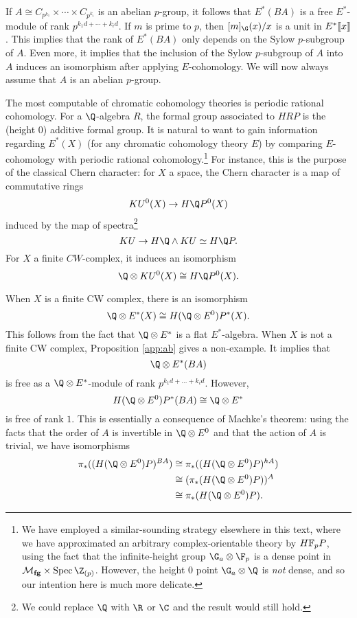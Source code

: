 If \(A \cong C_{p^{k_1}} \times \cdots \times C_{p^{k_i}}\) is an abelian \(p\)-group, it follows that \(E^*(BA)\) is a free \(E^*\)-module of rank \(p^{k_1d+\cdots + k_id}\). If \(m\) is prime to \(p\), then \([m]_{\G}(x)/x\) is a unit in \(E^*\llbracket{x}\rrbracket\). This implies that the rank of \(E^*(BA)\) only depends on the Sylow \(p\)-subgroup of \(A\). Even more, it implies that the inclusion of the Sylow \(p\)-subgroup of \(A\) into \(A\) induces an isomorphism after applying $E$-cohomology. We will now always assume that \(A\) is an abelian \(p\)-group.

The most computable of chromatic cohomology theories is periodic rational cohomology. For a \(\Q\)-algebra \(R\), the formal group associated to \(HRP\) is the (height \(0\)) additive formal group. It is natural to want to gain information regarding \(E^*(X)\) (for any chromatic cohomology theory \(E\)) by comparing \(E\)-cohomology with periodic rational cohomology.\footnote{We have employed a similar-sounding strategy elsewhere in this text, where we have approximated an arbitrary complex-orientable theory by \(\HFp P\), using the fact that the infinite-height group \(\G_a \otimes \F_p\) is a dense point in \(\moduli{fg} \times \Spec \Z_{(p)}\).  However, the height \(0\) point \(\G_a \otimes \Q\) is \emph{not} dense, and so our intention here is much more delicate.}  For instance, this is the purpose of the classical Chern character: for \(X\) a space, the Chern character is a map of commutative rings
\[
KU^0(X) \to H\Q P^0(X)
\] 
induced by the map of spectra\footnote{We could replace \(\Q\) with \(\R\) or \(\C\) and the result would still hold.} \[KU \to H\Q \wedge KU \simeq H\Q P.\] For \(X\) a finite \(CW\)-complex, it induces an isomorphism
\[
\Q \otimes KU^0(X) \cong H\Q P^0(X).
\]

When \(X\) is a finite CW complex, there is an isomorphism
\begin{equation*}
\Q \otimes E^*(X) \cong H(\Q \otimes E^0)P^*(X).
\end{equation*}
This follows from the fact that \(\Q \otimes E^*\) is a flat \(E^*\)-algebra. When \(X\) is not a finite CW complex, Proposition \ref{app:ab} gives a non-example. It implies that
\[
\Q \otimes E^*(BA)
\]
is free as a \(\Q \otimes E^*\)-module of rank \(p^{k_1d + \ldots + k_id}\). However, \[H(\Q \otimes E^0)P^*(BA) \cong \Q \otimes E^*\] is free of rank \(1\).  This is essentially a consequence of Machke's theorem: using the facts that the order of \(A\) is invertible in \(\Q \otimes E^0\) and that the action of \(A\) is trivial, we have isomorphisms
\begin{align*}
\pi_*((H(\Q \otimes E^0)P)^{BA}) &\cong \pi_*((H(\Q \otimes E^0)P)^{hA}) \\ &\cong (\pi_*(H(\Q \otimes E^0)P))^A \\ &\cong \pi_*(H(\Q \otimes E^0)P).
\end{align*}

